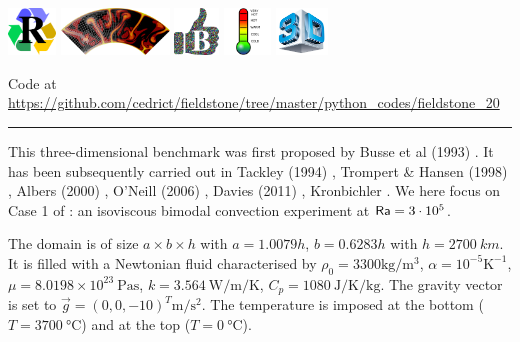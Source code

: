 
\includegraphics[height=1.25cm]{images/pictograms/replication}
\includegraphics[height=1.25cm]{images/pictograms/aspect_logo}
\includegraphics[height=1.25cm]{images/pictograms/benchmark}
\includegraphics[height=1.25cm]{images/pictograms/temperature}
\includegraphics[height=1.25cm]{images/pictograms/3d}



\begin{center}
Code at \url{https://github.com/cedrict/fieldstone/tree/master/python_codes/fieldstone_20}
\end{center}

\par\noindent\rule{\textwidth}{0.4pt}

This three-dimensional benchmark was first proposed by Busse et al (1993) \cite{bucc94}. 
It has been subsequently carried out in Tackley (1994) \cite{tack94},
Trompert \& Hansen (1998) \cite{trha98}, Albers (2000) \cite{albe00},
O'Neill \etal (2006) \cite{onmm06}, Davies \etal (2011) \cite{dawk11}, Kronbichler \etal \cite{krhb12}.
We here focus on Case 1 of \cite{bucc94}:  an isoviscous bimodal convection experiment at ${\mathsf{Ra}}=3\cdot 10^5$.

The domain is of size $a\times b\times h$ with $a=1.0079h$, $b=0.6283h$ 
with $h=\SI{2700}{km}$. It is filled with a Newtonian fluid 
characterised by $\rho_0=3300\si{\kg\per\cubic\meter}$, $\alpha=10^{-5}\si{\kelvin}^{-1}$, 
$\mu=8.0198\times10^{23}~\si{\pascal\second}$, 
$k=3.564~\si{\watt\per\meter\per\kelvin}$, 
$C_p=1080~\si{\joule\per\kelvin\per\kg}$.
The gravity vector is set to $\vec{g}=(0,0,-10)^T\si{\meter\per\square\second}$.
The temperature is imposed at the bottom  ($T=3700~\si{\celsius}$) and at the top ($T=0~\si{\celsius}$).

